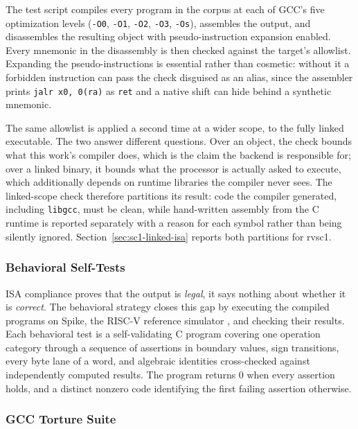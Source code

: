 The test script compiles every program in the corpus at each of
GCC's five optimization levels (\texttt{-O0}, \texttt{-O1}, \texttt{-O2}, \texttt{-O3},
\texttt{-Os}), assembles the output, and disassembles the resulting object with pseudo-instruction
expansion enabled. Every mnemonic in the disassembly is then checked against the target's allowlist.
Expanding the pseudo-instructions is essential rather than cosmetic: without it a forbidden
instruction can pass the check disguised as an alias, since the assembler prints
\texttt{jalr x0, 0(ra)} as \texttt{ret} and a native shift can hide behind a synthetic mnemonic.

The same allowlist is applied a second time at a wider scope, to the fully linked executable. The two
answer different questions. Over an object, the check bounds what this work's compiler does, which is
the claim the backend is responsible for; over a linked binary, it bounds what the processor is
actually asked to execute, which additionally depends on runtime libraries the compiler never sees.
The linked-scope check therefore partitions its result: code the compiler generated, including
\texttt{libgcc}, must be clean, while hand-written assembly from the C runtime is reported separately
with a reason for each symbol rather than being silently ignored. Section~\ref{sec:sc1-linked-isa}
reports both partitions for rvsc1.

\subsubsection{Behavioral Self-Tests} \label{sec:strategy-behav}

ISA compliance proves that the output is \textit{legal}, it says nothing about whether it is
\textit{correct}. The behavioral strategy closes this gap by executing the compiled programs on Spike,
the RISC-V reference simulator \cite{spike}, and checking their results. Each behavioral test is a
self-validating C program covering one operation category through a sequence of assertions in boundary
values, sign transitions, every byte lane of a word, and algebraic identities cross-checked against
independently computed results. The program returns 0 when every assertion holds, and a distinct
nonzero code identifying the first failing assertion otherwise.

\subsubsection{GCC Torture Suite} \label{sec:strategy-torture}


